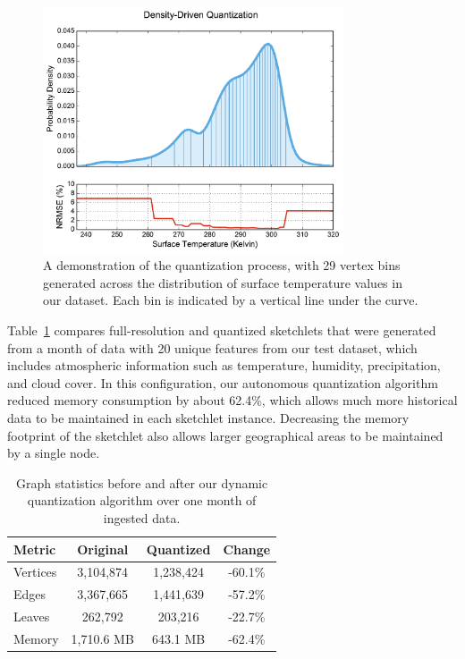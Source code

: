 \begin{figure}
    \centerline{\includegraphics[width=3.5in]{figures/quantization.pdf}}
    \caption{A demonstration of the quantization process, with 29 vertex bins generated across the distribution of surface temperature values in our dataset. Each bin is indicated by a vertical line under the curve.}
    \label{fig:quantization}
\end{figure}

Table~\ref{tbl:graph-stats} compares full-resolution and quantized sketchlets that were generated from a month of data with 20 unique features from our test dataset, which includes atmospheric information such as temperature, humidity, precipitation, and cloud cover. In this configuration, our autonomous quantization algorithm reduced memory consumption by about 62.4\%, which allows much more historical data to be maintained in each sketchlet instance. Decreasing the memory footprint of the sketchlet also allows larger geographical areas to be maintained by a single node.

\begin{table}[h!]
    \renewcommand{\arraystretch}{1.3}
    \caption{Graph statistics before and after our dynamic quantization algorithm over one month of ingested data.\vspace{-1em}}
    \label{tbl:graph-stats}
    \begin{center}
        \begin{tabular}{|l|c|c|c|}
            \hline
            \textbf{Metric} & \textbf{Original} & \textbf{Quantized} & \textbf{Change} \\
            \hline
            Vertices & 3,104,874 & 1,238,424 & -60.1\% \\
            \hline
            Edges    & 3,367,665 & 1,441,639 & -57.2\% \\
            \hline
            Leaves   & 262,792   & 203,216   & -22.7\% \\
            \hline
            Memory   & 1,710.6 MB & 643.1 MB  & -62.4\% \\
            \hline
        \end{tabular}
    \end{center}
\end{table}

